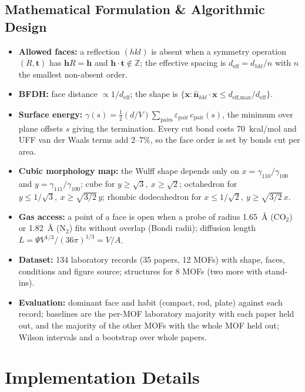 \documentclass[11pt, a4paper]{article}
\begin{document}
\subsection{Mathematical Formulation \& Algorithmic Design}
\begin{itemize}[noitemsep, topsep=2pt]
    \item \textbf{Allowed faces:} a reflection $(hkl)$ is absent when a symmetry operation $(R, \mathbf{t})$ has $\mathbf{h}R = \mathbf{h}$ and $\mathbf{h}\cdot\mathbf{t} \notin \mathbb{Z}$; the effective spacing is $d_\text{eff} = d_{hkl}/n$ with $n$ the smallest non-absent order.
    \item \textbf{BFDH:} face distance $\propto 1/d_\text{eff}$; the shape is $\{\mathbf{x} : \hat{\mathbf{n}}_{hkl}\cdot\mathbf{x} \le d_{\text{eff,max}}/d_\text{eff}\}$.
    \item \textbf{Surface energy:} $\gamma(s) = \tfrac12 (d/V)\sum_\text{pairs} \varepsilon_\text{pair}\, c_\text{pair}(s)$, the minimum over plane offsets $s$ giving the termination. Every cut bond costs 70~kcal/mol and UFF van der Waals terms \cite{rappe1992} add 2--7\%, so the face order is set by bonds cut per area.
    \item \textbf{Cubic morphology map:} the Wulff shape depends only on $x=\gamma_{110}/\gamma_{100}$ and $y=\gamma_{111}/\gamma_{100}$; cube for $y\ge\sqrt3,\ x\ge\sqrt2$; octahedron for $y\le 1/\sqrt3,\ x\ge\sqrt{3/2}\,y$; rhombic dodecahedron for $x\le1/\sqrt2,\ y\ge\sqrt{3/2}\,x$.
    \item \textbf{Gas access:} a point of a face is open when a probe of radius 1.65~\AA{} (CO$_2$) or 1.82~\AA{} (N$_2$) fits without overlap (Bondi radii); diffusion length $L = \Psi V^{1/3}/(36\pi)^{1/3} = V/A$.
    \item \textbf{Dataset:} 134 laboratory records (35 papers, 12 MOFs) with shape, faces, conditions and figure source; structures for 8 MOFs (two more with stand-ins).
    \item \textbf{Evaluation:} dominant face and habit (compact, rod, plate) against each record; baselines are the per-MOF laboratory majority with each paper held out, and the majority of the other MOFs with the whole MOF held out; Wilson intervals and a bootstrap over whole papers.
\end{itemize}

\section{Implementation Details}
\end{document}
